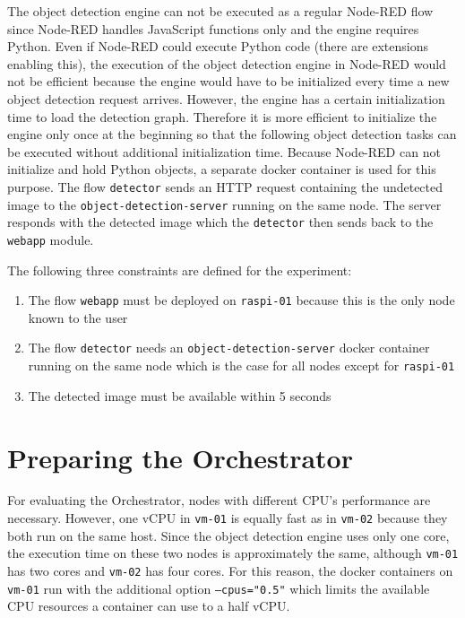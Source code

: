 The object detection engine can not be executed as a regular Node-RED flow since Node-RED handles JavaScript functions only and the engine requires Python.
Even if Node-RED could execute Python code (there are extensions enabling this), the execution of the object detection engine in Node-RED would not be efficient because the engine would have to be initialized every time a new object detection request arrives.
However, the engine has a certain initialization time to load the detection graph. Therefore it is more efficient to initialize the engine only once at the beginning so that the following object detection tasks can be executed without additional initialization time. Because Node-RED can not initialize and hold Python objects, a separate docker container is used for this purpose. The flow \texttt{detector} sends an HTTP request containing the undetected image to the \texttt{object-detection-server} running on the same node. The server responds with the detected image which the \texttt{detector} then sends back to the \texttt{webapp} module.

The following three constraints are defined for the experiment:
\begin{enumerate}
    \item The flow \texttt{webapp} must be deployed on \texttt{raspi-01} because this is the only node known to the user
    \item The flow \texttt{detector} needs an \texttt{object-detection-server} docker container running on the same node which is the case for all nodes except for \texttt{raspi-01}
    \item The detected image must be available within 5 seconds
\end{enumerate}








\section{Preparing the Orchestrator\label{sec:eval-preparing-the-orchestrator}}

For evaluating the Orchestrator, nodes with different CPU's performance are necessary.
However, one vCPU in \texttt{vm-01} is equally fast as in \texttt{vm-02} because they both run on the same host.
Since the object detection engine uses only one core, the execution time on these two nodes is approximately the same, although \texttt{vm-01} has two cores and \texttt{vm-02} has four cores.
For this reason, the docker containers on \texttt{vm-01} run with the additional option \texttt{---cpus="0.5"} which limits the available CPU resources a container can use to a half vCPU.

